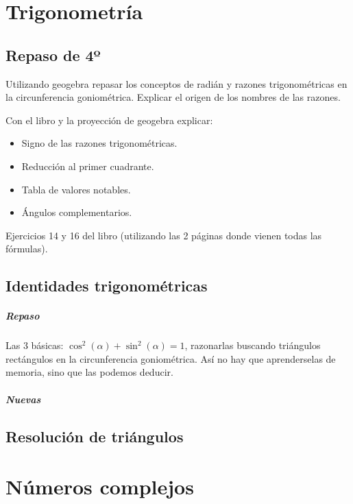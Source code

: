\documentclass[palatino,nosec]{Docencia}
\begin{document}
\chapter{Trigonometría}

\section{Repaso de 4º}

Utilizando geogebra repasar los conceptos de radián y razones trigonométricas en la circunferencia goniométrica.
Explicar el origen de los nombres de las razones.

Con el libro y la proyección de geogebra explicar:
\begin{itemize}
	\item Signo de las razones trigonométricas.
	\item Reducción al primer cuadrante.
	\item Tabla de valores notables.
	\item Ángulos complementarios.
\end{itemize}

Ejercicios 14 y 16 del libro (utilizando las 2 páginas donde vienen todas las fórmulas).

\section{Identidades trigonométricas}

\paragraph{Repaso}

Las 3 básicas: $\cos^2(α)+\sin^2(α) = 1$, razonarlas buscando triángulos rectángulos en la circunferencia goniométrica.
Así no hay que aprenderselas de memoria, sino que las podemos deducir.

\paragraph{Nuevas}

\section{Resolución de triángulos}

\chapter{Números complejos}

\printindex
\end{document}
